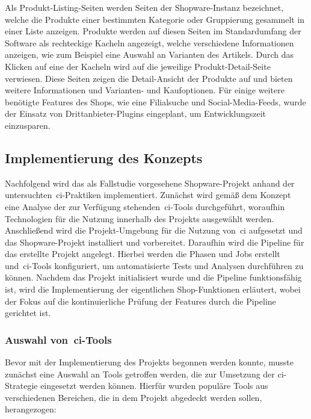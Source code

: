 Als Produkt-Listing-Seiten werden Seiten der Shopware-Instanz bezeichnet, welche die Produkte einer bestimmten
Kategorie oder Gruppierung gesammelt in einer Liste anzeigen.
Produkte werden auf diesen Seiten im Standardumfang der Software als rechteckige Kacheln angezeigt, welche
verschiedene Informationen anzeigen, wie zum Beispiel eine Auswahl an Varianten des Artikels.
Durch das Klicken auf eine der Kacheln wird auf die jeweilige Produkt-Detail-Seite verwiesen.
Diese Seiten zeigen die Detail-Ansicht der Produkte auf und bieten weitere Informationen und Varianten- und
Kaufoptionen.
Für einige weitere benötigte Features des Shops, wie eine Filialsuche und Social-Media-Feeds, wurde der Einsatz von
Drittanbieter-Plugins eingeplant, um Entwicklungszeit einzusparen.

\subsection{Implementierung des Konzepts} \label{subsec:04-implementation-2}

Nachfolgend wird das als Fallstudie vorgesehene Shopware-Projekt anhand der untersuchten\ \acrshort{ci}-Praktiken
implementiert.
Zunächst wird gemäß dem Konzept eine Analyse der zur Verfügung stehenden\ \acrshort{ci}-Tools durchgeführt,
woraufhin Technologien für die Nutzung innerhalb des Projekts ausgewählt werden.
Anschließend wird die Projekt-Umgebung für die Nutzung von\ \acrshort{ci} aufgesetzt und das Shopware-Projekt
installiert und vorbereitet.
Daraufhin wird die Pipeline für das erstellte Projekt angelegt.
Hierbei werden die Phasen und Jobs erstellt und\ \acrshort{ci}-Tools konfiguriert, um automatisierte Tests und Analysen
durchführen zu können.
Nachdem das Projekt initialisiert wurde und die Pipeline funktionsfähig ist, wird die Implementierung der eigentlichen
Shop-Funktionen erläutert, wobei der Fokus auf die kontinuierliche Prüfung der Features durch die Pipeline gerichtet
ist.

\subsubsection{Auswahl von\ \acrshort{ci}-Tools}

Bevor mit der Implementierung des Projekts begonnen werden konnte, musste zunächst eine Auswahl an Tools getroffen
werden, die zur Umsetzung der \acrshort{ci}-Strategie eingesetzt werden können.
Hierfür wurden populäre Tools aus verschiedenen Bereichen, die in dem Projekt abgedeckt werden sollen, herangezogen:\\

